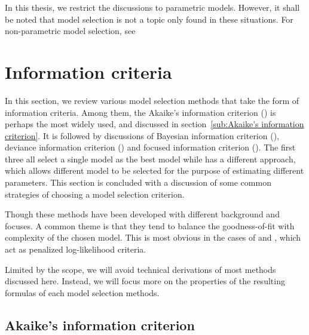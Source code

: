 In this thesis, we restrict the discussions to parametric models. However, it
shall be noted that model selection is not a topic only found in these
situations. For non-parametric model selection, see

\section{Information criteria}
\label{sec:Information criteria}

In this section, we review various model selection methods that take the form
of information criteria. Among them, the Akaike's information criterion (\aic)
is perhaps the most widely used, and discussed in section~\ref{sub:Akaike's
  information criterion}. It is followed by discussions of Bayesian
information criterion (\bic), deviance information criterion (\dic) and
focused information criterion (\fic). The first three all select a single
model as the best model while \fic has a different approach, which allows
different model to be selected for the purpose of estimating different
parameters. This section is concluded with a discussion of some common
strategies of choosing a model selection criterion.

Though these methods have been developed with different background and
focuses. A common theme is that they tend to balance the goodness-of-fit with
complexity of the chosen model. This is most obvious in the cases of \aic and
\bic, which act as penalized log-likelihood criteria.

Limited by the scope, we will avoid technical derivations of most methods
discussed here. Instead, we will focus more on the properties of the resulting
formulas of each model selection methods.

\subsection{Akaike's information criterion}
\label{sub:Akaike's information criterion}

